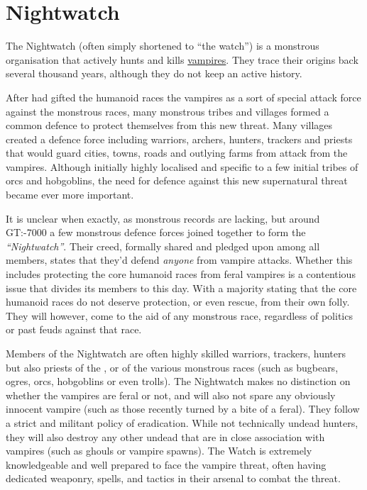 \section{Nightwatch}
\label{sec:Nightwatch}

The Nightwatch (often simply shortened to ``the watch'') is a monstrous
organisation that actively hunts and kills \hyperref[sec:Vampires]{vampires}.
They trace their origins back several thousand years, although they do not
keep an active history.

After  had gifted the humanoid races the vampires as a
sort of special attack force against the monstrous races, many monstrous
tribes and villages formed a common defence to protect themselves from this
new threat. Many villages created a defence force including warriors, archers,
hunters, trackers and priests that would guard cities, towns, roads and
outlying farms from attack from the vampires. Although initially highly
localised and specific to a few initial tribes of orcs and hobgoblins, the
need for defence against this new supernatural threat became ever more
important.

It is unclear when exactly, as monstrous records are lacking, but around
GT:-7000 a few monstrous defence forces joined together to form the
\emph{``Nightwatch''}. Their creed, formally shared and pledged upon among all
members, states that they'd defend \emph{anyone} from vampire attacks. Whether
this includes protecting the core humanoid races from feral vampires is a
contentious issue that divides its members to this day. With a majority
stating that the core humanoid races do not deserve protection, or even
rescue, from their own folly. They will however, come to the aid of any
monstrous race, regardless of politics or past feuds against that race.

Members of the Nightwatch are often highly skilled warriors, trackers, hunters
but also priests of the , or  of the
various monstrous races (such as bugbears, ogres, orcs, hobgoblins or even
trolls). The Nightwatch makes no distinction on whether the vampires are feral
or not, and will also not spare any obviously innocent vampire (such as those
recently turned by a bite of a feral). They follow a strict and militant
policy of eradication. While not technically undead hunters, they will also
destroy any other undead that are in close association with vampires (such as
ghouls or vampire spawns). The Watch is extremely knowledgeable and well
prepared to face the vampire threat, often having dedicated weaponry, spells,
and tactics in their arsenal to combat the threat.


